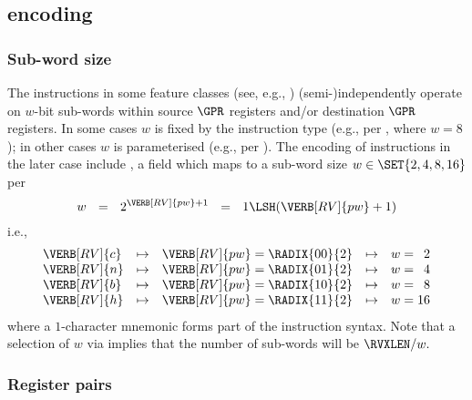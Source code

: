 \subsection{\XCRYPTO encoding}
\label{sec:spec:encoding}


\subsubsection{Sub-word size}
\label{sec:spec:encoding:subword}

The instructions in some feature classes
(see, e.g., )
(semi-)independently operate on $w$-bit sub-words within 
source      $\GPR$ registers
and/or
destination $\GPR$ registers.
In some  cases 
$w$ is fixed by the instruction type
(e.g.,  per , where $w = 8$);
in other cases
$w$ is parameterised
(e.g.,   per ).
The encoding of instructions in the later case include ,
a field which maps to a sub-word size
$
w \in \SET{ 2, 4, 8, 16 }
$ 
per
\[
w ~~=~~ 2^{\VERB[RV]{pw}+1} ~~=~~ 1 \LSH ( \VERB[RV]{pw} + 1 )
\]
i.e., 
\[
\begin{array}{l c l@{\;}c@{\;}r c l@{\;}c@{\;}r}
\VERB[RV]{c} &\mapsto& \VERB[RV]{pw} &=& \RADIX{00}{2} &\mapsto& w &=&  2 \\
\VERB[RV]{n} &\mapsto& \VERB[RV]{pw} &=& \RADIX{01}{2} &\mapsto& w &=&  4 \\
\VERB[RV]{b} &\mapsto& \VERB[RV]{pw} &=& \RADIX{10}{2} &\mapsto& w &=&  8 \\
\VERB[RV]{h} &\mapsto& \VERB[RV]{pw} &=& \RADIX{11}{2} &\mapsto& w &=& 16 \\
\end{array}
\]
where a $1$-character mnemonic forms part of the instruction syntax.
Note that a selection of $w$ via  implies that the number 
of sub-words will be
$
\RVXLEN / w .
$


\subsubsection{Register pairs}
\label{sec:spec:encoding:pair}

